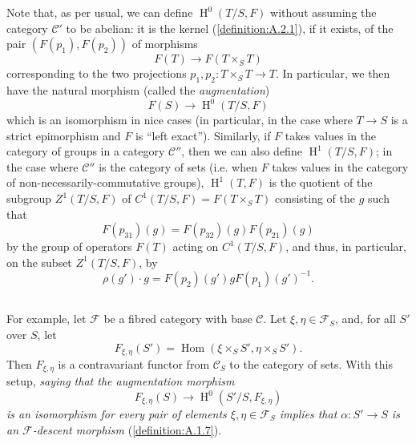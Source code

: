 \documentclass{article}
\theoremstyle{plain}
\theoremstyle{definition}
\newcommand{\sh}[1]{{\mathscr{#1}}}
\newcommand{\cat}[1]{{\mathcal{#1}}}
\DeclareMathOperator{\Hom}{Hom}
\DeclareMathOperator{\HH}{H}
\begin{document}
Note that, as per usual, we can define $\HH^0(T/S,F)$ without assuming the category $\cat{C}'$ to be abelian:
it is the kernel (\cref{definition:A.2.1}), if it exists, of the pair $(F(p_1),F(p_2))$ of morphisms
\[
  F(T) \to F(T\times_S T)
\]
corresponding to the two projections $p_1,p_2\colon T\times_S T\to T$.
In particular, we then have the natural morphism (called the \emph{augmentation})
\[
  F(S) \to \HH^0(T/S,F)
\]
which is an isomorphism in nice cases (in particular, in the case where $T\to S$ is a strict epimorphism and $F$ is ``left exact'').
Similarly, if $F$ takes values in the category of groups in a category $\cat{C}''$, then we can also define $\HH^1(T/S,F)$;
in the case where $\cat{C}''$ is the category of sets (i.e. when $F$ takes values in the category of non-necessarily-commutative groups), $\HH^1(T,F)$ is the quotient of the subgroup $Z^1(T/S,F)$ of $C^1(T/S,F) = F(T\times_S T)$ consisting of the $g$ such that
\[
  F(p_{31})(g) = F(p_{32})(g) F(p_{21})(g)
\]
by the group of operators $F(T)$ acting on $C^1(T/S,F)$, and thus, in particular, on the subset $Z^1(T/S,F)$, by
\[
  \rho(g')\cdot g = F(p_2)(g') g F(p_1)(g')^{-1}.
\]


\subsection{}
\label{A.4.b}

For example, let $\sh{F}$ be a fibred category with base $\cat{C}$.
Let $\xi,\eta\in\sh{F}_S$, and, for all $S'$ over $S$, let
\[
  F_{\xi,\eta}(S') = \Hom(\xi\times_S S', \eta\times_S S').
\]
Then $F_{\xi,\eta}$ is a contravariant functor from $\cat{C}_S$ to the category of sets.
With this setup, \emph{saying that the augmentation morphism}
\[
  F_{\xi,\eta}(S) \to \HH^0(S'/S,F_{\xi,\eta})
\]
\emph{is an isomorphism for every pair of elements $\xi,\eta\in\sh{F}_S$ implies that $\alpha\colon S'\to S$ is an $\sh{F}$-descent morphism} (\cref{definition:A.1.7}).


\subsection{}
\label{A.4.c}
\end{document}
